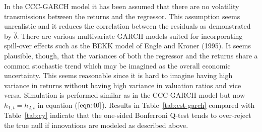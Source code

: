 \documentclass{article}
\begin{document}
In the CCC-GARCH model it has been assumed that there are no volatility transmissions between the returns and the regressor. This assumption seems unrealistic and it reduces the correlation between the residuals as demonstrated by $\hat{\delta}$. There are various multivariate GARCH models suited for incorporating spill-over effects such as the BEKK model of Engle and Kroner (1995). It seems plausible, though, that the variances of both the regressor and the returns share a common stochastic trend which may be imagined as the overall economic uncertainty. This seems reasonable since it is hard to imagine having high variance in returns without having high variance in valuation ratios and vice versa. Simulation is performed similar as in the CCC-GARCH model but now $h_{1, t} =h_{2, t}$ in equation ($\ref{eqn:40}$). Results in Table~\vref{tab:cst-garch} compared with Table~\vref{tab:cy}  indicate that the one-sided Bonferroni Q-test tends to over-reject the true null if innovations are modeled as described above.
\end{document}
